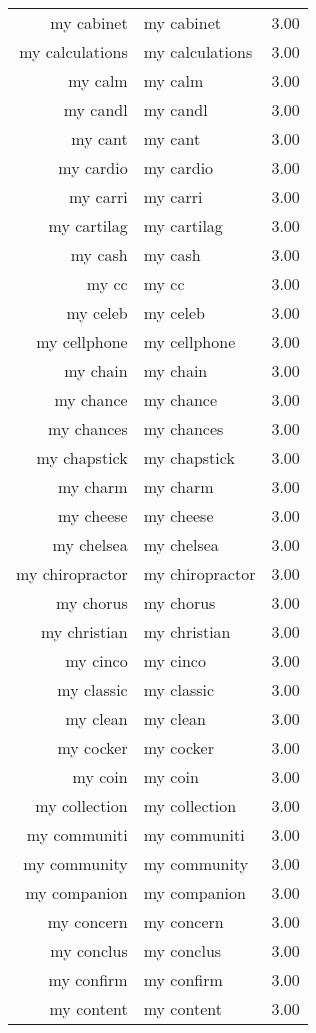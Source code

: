\begin{table}[ht]
\begin{tabular}{rlr}
  my cabinet & my cabinet & 3.00 \\ 
  my calculations & my calculations & 3.00 \\ 
  my calm & my calm & 3.00 \\ 
  my candl & my candl & 3.00 \\ 
  my cant & my cant & 3.00 \\ 
  my cardio & my cardio & 3.00 \\ 
  my carri & my carri & 3.00 \\ 
  my cartilag & my cartilag & 3.00 \\ 
  my cash & my cash & 3.00 \\ 
  my cc & my cc & 3.00 \\ 
  my celeb & my celeb & 3.00 \\ 
  my cellphone & my cellphone & 3.00 \\ 
  my chain & my chain & 3.00 \\ 
  my chance & my chance & 3.00 \\ 
  my chances & my chances & 3.00 \\ 
  my chapstick & my chapstick & 3.00 \\ 
  my charm & my charm & 3.00 \\ 
  my cheese & my cheese & 3.00 \\ 
  my chelsea & my chelsea & 3.00 \\ 
  my chiropractor & my chiropractor & 3.00 \\ 
  my chorus & my chorus & 3.00 \\ 
  my christian & my christian & 3.00 \\ 
  my cinco & my cinco & 3.00 \\ 
  my classic & my classic & 3.00 \\ 
  my clean & my clean & 3.00 \\ 
  my cocker & my cocker & 3.00 \\ 
  my coin & my coin & 3.00 \\ 
  my collection & my collection & 3.00 \\ 
  my communiti & my communiti & 3.00 \\ 
  my community & my community & 3.00 \\ 
  my companion & my companion & 3.00 \\ 
  my concern & my concern & 3.00 \\ 
  my conclus & my conclus & 3.00 \\ 
  my confirm & my confirm & 3.00 \\ 
  my content & my content & 3.00 \\ 

\end{tabular}
\end{table}
